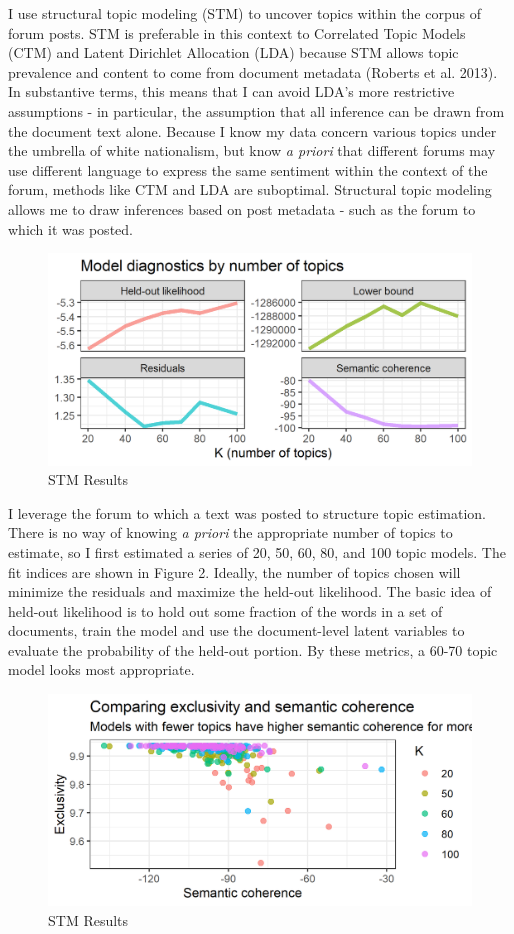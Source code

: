 \documentclass[12pt]{paper}
\begin{document}
I use structural topic modeling (STM) to uncover topics within the corpus of forum posts. STM is preferable in this context to Correlated Topic Models (CTM) and Latent Dirichlet Allocation (LDA) because STM allows topic prevalence and content to come from document metadata (Roberts et al. 2013). In substantive terms, this means that I can avoid LDA’s more restrictive assumptions - in particular, the assumption that all inference can be drawn from the document text alone. Because I know my data concern various topics under the umbrella of white nationalism, but know \textit{a priori} that different forums may use different language to express the same sentiment within the context of the forum, methods like CTM and LDA are suboptimal. Structural topic modeling allows me to draw inferences based on post metadata - such as the forum to which it was posted.

\begin{figure} \centering
	\includegraphics[width=.8\linewidth]{figs/diagnostics-by-topic.png}
	\caption{STM Results}
	\label{}
\end{figure}

I leverage the forum to which a text was posted to structure topic estimation. There is no way of knowing \textit{a priori} the appropriate number of topics to estimate, so I first estimated a series of 20, 50, 60, 80, and 100 topic models. The fit indices are shown in Figure 2. Ideally, the number of topics chosen will minimize the residuals and maximize the held-out likelihood. The basic idea of held-out likelihood is to hold out some fraction of the words in a set of documents, train the model and use the document-level latent variables to evaluate the probability of the held-out portion. By these metrics, a 60-70 topic model looks most appropriate. 

\begin{figure} \centering
	\includegraphics[width=.8\linewidth]{figs/exclusivity-vs-semantics.png}
	\caption{STM Results}
	\label{}
\end{figure}
\end{document}
